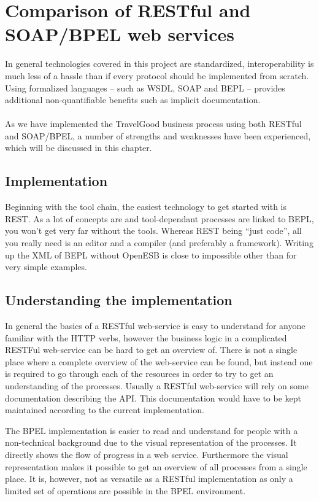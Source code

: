 {\setlength{\chapterfontsize}{26pt}
\chapter{Comparison of RESTful and SOAP/BPEL web services}
}
In general technologies covered in this project are standardized, interoperability is much less of a hassle than if every protocol should be implemented from scratch. Using formalized languages -- such as WSDL, SOAP and BEPL -- provides additional non-quantifiable benefits such as implicit documentation.\\\\
As we have implemented the TravelGood business process using both RESTful and SOAP/BPEL, a number of strengths and weaknesses have been experienced, which will be discussed in this chapter.

\section{Implementation}
Beginning with the tool chain, the easiest technology to get started with is REST. As a lot of concepts are and tool-dependant processes are linked to BEPL, you won't get very far without the tools. Whereas REST being ``just code'', all you really need is an editor and a compiler (and preferably a framework). Writing up the XML of BEPL without OpenESB is close to impossible other than for very simple examples.

\section{Understanding the implementation}
In general the basics of a RESTful web-service is easy to understand for anyone familiar with the HTTP verbs, however the business logic in a complicated RESTFul web-service can be hard to get an overview of. There is not a single place where a complete overview of the web-service can be found, but instead one is required to go through each of the resources in order to try to get an understanding of the processes. Usually a RESTful web-service will rely on some documentation describing the API. This documentation would have to be kept maintained according to the current implementation. 

The BPEL implementation is easier to read and understand for people with a non-technical background due to the visual representation of the processes. It directly shows the flow of progress in a web service. Furthermore the visual representation makes it possible to get an overview of all processes from a single place. It is, however, not as versatile as a RESTful implementation as only a limited set of operations are possible in the BPEL environment.

